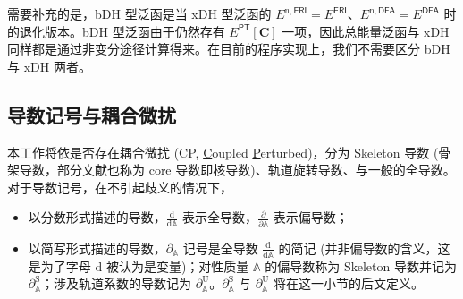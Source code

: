 需要补充的是，bDH 型泛函是当 xDH 型泛函的 $E^{\mathrm{n}, \textsf{ERI}} = E^\textsf{ERI}$、$E^{\mathrm{n}, \textsf{DFA}} = E^\textsf{DFA}$ 时的退化版本。bDH 型泛函由于仍然存有 $E^\textsf{PT} [\mathbf{C}]$ 一项，因此总能量泛函与 xDH 同样都是通过非变分途径计算得来。在目前的程序实现上，我们不需要区分 bDH 与 xDH 两者。

\subsection{导数记号与耦合微扰}

本工作将依是否存在耦合微扰 (CP, \underline{C}oupled \underline{P}erturbed)，分为 Skeleton 导数 (骨架导数，部分文献也称为 core 导数即核导数)、轨道旋转导数、与一般的全导数。对于导数记号，在不引起歧义的情况下，
\begin{itemize}[nosep]
  \item 以分数形式描述的导数，$\frac{\mathrm{d}}{\mathrm{d} \mathbb{A}}$ 表示全导数，$\frac{\partial}{\partial \mathbb{A}}$ 表示偏导数；
  \item 以简写形式描述的导数，$\partial_{\mathbb{A}}$ 记号是\textsf{全导数} $\frac{\mathrm{d}}{\mathrm{d} \mathbb{A}}$ 的简记 (并非偏导数的含义，这是为了字母 $\mathrm{d}$ 被认为是变量)；对性质量 $\mathbb{A}$ 的偏导数称为 Skeleton 导数并记为 $\partial_{\mathbb{A}}^{\mathrm{S}}$；涉及轨道系数的导数记为 $\partial_{\mathbb{A}}^{\mathrm{U}}$。$\partial_{\mathbb{A}}^{\mathrm{S}}$ 与 $\partial_{\mathbb{A}}^{\mathrm{U}}$ 将在这一小节的后文定义。
\end{itemize}

